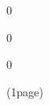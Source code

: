 \documentclass{article}
\begin{document}
\begin{center}
\fontsize{18pt}
     0 
\end{center}
\begin{large}
     
\end{large}


\begin{center}
\fontsize{18pt}
     0 
\end{center}
\begin{large}
     
\end{large}


\begin{center}
\fontsize{18pt}
     0 
\end{center}
\begin{large}
     (1page)
\end{large}

\end{document}
